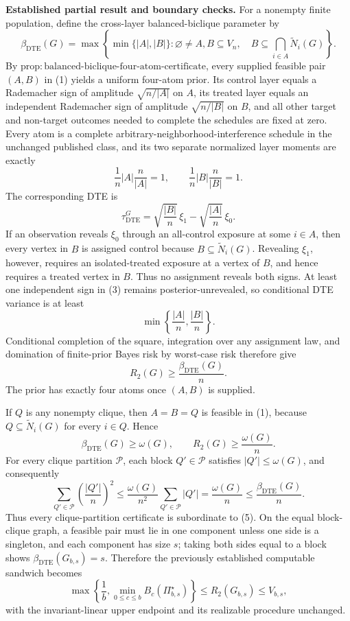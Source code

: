 \textbf{Established partial result and boundary checks.}
For a nonempty finite population, define the cross-layer balanced-biclique parameter by
\[
\beta_{\mathrm{DTE}}(G)
=
\max\left\{
\min\{|A|,|B|\}:
\varnothing\ne A,B\subseteq V_n,
\quad
B\subseteq\bigcap_{i\in A}\widetilde N_i(G)
\right\}.
\tag{1}
\]
By \(\mathrm{prop{:}balanced\text{-}biclique\text{-}four\text{-}atom\text{-}certificate}\), every supplied feasible pair \((A,B)\) in (1) yields a uniform four-atom prior.  Its control layer equals a Rademacher sign of amplitude \(\sqrt{n/|A|}\) on \(A\), its treated layer equals an independent Rademacher sign of amplitude \(\sqrt{n/|B|}\) on \(B\), and all other target and non-target outcomes needed to complete the schedules are fixed at zero.  Every atom is a complete arbitrary-neighborhood-interference schedule in the unchanged published class, and its two separate normalized layer moments are exactly
\[
\frac1n|A|\frac n{|A|}=1,
\qquad
\frac1n|B|\frac n{|B|}=1.
\tag{2}
\]
The corresponding DTE is
\[
\tau_{\mathrm{DTE}}^G
=
\sqrt{\frac{|B|}{n}}\,\xi_1
-
\sqrt{\frac{|A|}{n}}\,\xi_0.
\tag{3}
\]
If an observation reveals \(\xi_0\) through an all-control exposure at some \(i\in A\), then every vertex in \(B\) is assigned control because \(B\subseteq\widetilde N_i(G)\).  Revealing \(\xi_1\), however, requires an isolated-treated exposure at a vertex of \(B\), and hence requires a treated vertex in \(B\).  Thus no assignment reveals both signs.  At least one independent sign in (3) remains posterior-unrevealed, so conditional DTE variance is at least
\[
\min\left\{\frac{|A|}{n},\frac{|B|}{n}\right\}.
\tag{4}
\]
Conditional completion of the square, integration over any assignment law, and domination of finite-prior Bayes risk by worst-case risk therefore give
\[
R_2(G)\geq\frac{\beta_{\mathrm{DTE}}(G)}n.
\tag{5}
\]
The prior has exactly four atoms once \((A,B)\) is supplied.

If \(Q\) is any nonempty clique, then \(A=B=Q\) is feasible in (1), because \(Q\subseteq\widetilde N_i(G)\) for every \(i\in Q\).  Hence
\[
\beta_{\mathrm{DTE}}(G)\geq\omega(G),
\qquad
R_2(G)\geq\frac{\omega(G)}n.
\tag{6}
\]
For every clique partition \(\mathcal P\), each block \(Q'\in\mathcal P\) satisfies \(|Q'|\leq\omega(G)\), and consequently
\[
\sum_{Q'\in\mathcal P}\left(\frac{|Q'|}{n}\right)^2
\leq
\frac{\omega(G)}{n^2}\sum_{Q'\in\mathcal P}|Q'|
=\frac{\omega(G)}n
\leq\frac{\beta_{\mathrm{DTE}}(G)}n.
\tag{7}
\]
Thus every clique-partition certificate is subordinate to (5).  On the equal block-clique graph, a feasible pair must lie in one component unless one side is a singleton, and each component has size \(s\); taking both sides equal to a block shows \(\beta_{\mathrm{DTE}}(G_{b,s})=s\).  Therefore the previously established computable sandwich becomes
\[
\max\left\{
\frac1b,
\min_{0\leq c\leq b}B_c(\Pi_{b,s}^{\star})
\right\}
\leq R_2(G_{b,s})\leq V_{b,s},
\tag{8}
\]
with the invariant-linear upper endpoint and its realizable procedure unchanged.


